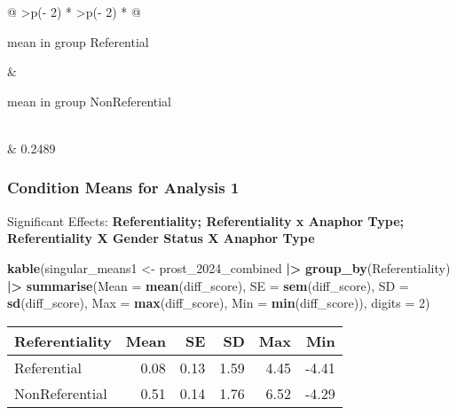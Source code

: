 \documentclass[
  10pt,
]{article}
\newenvironment{Shaded}{\begin{snugshade}}{\end{snugshade}}
\newcommand{\AttributeTok}[1]{\textcolor[rgb]{0.13,0.29,0.53}{#1}}
\newcommand{\DecValTok}[1]{\textcolor[rgb]{0.00,0.00,0.81}{#1}}
\newcommand{\FunctionTok}[1]{\textcolor[rgb]{0.13,0.29,0.53}{\textbf{#1}}}
\newcommand{\NormalTok}[1]{#1}
\newcommand{\OtherTok}[1]{\textcolor[rgb]{0.56,0.35,0.01}{#1}}
\newcommand{\SpecialCharTok}[1]{\textcolor[rgb]{0.81,0.36,0.00}{\textbf{#1}}}
\begin{document}
\begin{longtable}[]{@{}
  >{\centering\arraybackslash}p{(\columnwidth - 2\tabcolsep) * }
  >{\centering\arraybackslash}p{(\columnwidth - 2\tabcolsep) * }@{}}
\toprule\noalign{}
\begin{minipage}[b]{\linewidth}\centering
mean in group Referential
\end{minipage} & \begin{minipage}[b]{\linewidth}\centering
mean in group NonReferential
\end{minipage} \\
\midrule\noalign{}
\endhead
\bottomrule\noalign{}
 & 0.2489 \\
\end{longtable}

\subsubsection{Condition Means for Analysis
1}\label{condition-means-for-analysis-1}

Significant Effects: \textbf{Referentiality; Referentiality x Anaphor
Type; Referentiality X Gender Status X Anaphor Type}

\begin{Shaded}
\begin{Highlighting}[]
\FunctionTok{kable}\NormalTok{(singular\_means1 }\OtherTok{\textless{}{-}}\NormalTok{ prost\_2024\_combined }\SpecialCharTok{|\textgreater{}} 
  \FunctionTok{group\_by}\NormalTok{(Referentiality) }\SpecialCharTok{|\textgreater{}}
  \FunctionTok{summarise}\NormalTok{(}\AttributeTok{Mean =} \FunctionTok{mean}\NormalTok{(diff\_score), }
            \AttributeTok{SE =} \FunctionTok{sem}\NormalTok{(diff\_score), }
            \AttributeTok{SD =} \FunctionTok{sd}\NormalTok{(diff\_score), }
            \AttributeTok{Max =} \FunctionTok{max}\NormalTok{(diff\_score), }
            \AttributeTok{Min =} \FunctionTok{min}\NormalTok{(diff\_score)), }\AttributeTok{digits =} \DecValTok{2}\NormalTok{)}
\end{Highlighting}
\end{Shaded}

\begin{longtable}[]{@{}lrrrrr@{}}
\toprule\noalign{}
Referentiality & Mean & SE & SD & Max & Min \\
\midrule\noalign{}
\endhead
\bottomrule\noalign{}
\endlastfoot
Referential & 0.08 & 0.13 & 1.59 & 4.45 & -4.41 \\
NonReferential & 0.51 & 0.14 & 1.76 & 6.52 & -4.29 \\
\end{longtable}
\end{document}
